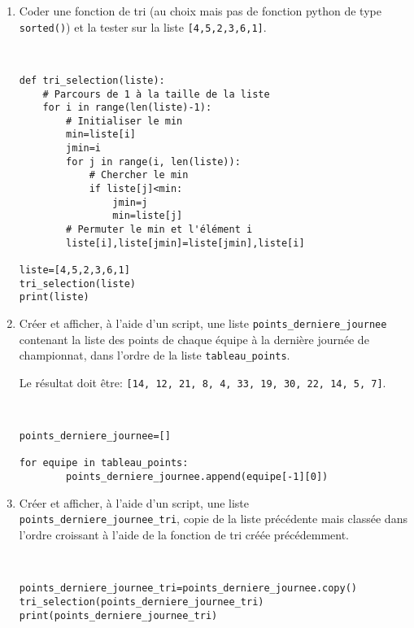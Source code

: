 \begin{enumerate}
\item Coder une fonction de tri (au choix mais pas de fonction python de type \verb?sorted()?) et la tester sur la liste \verb?[4,5,2,3,6,1]?.

\begin{solution}~\ \\
\begin{verbatim}
def tri_selection(liste): 
    # Parcours de 1 à la taille de la liste
    for i in range(len(liste)-1):
        # Initialiser le min
        min=liste[i]
        jmin=i
        for j in range(i, len(liste)):
            # Chercher le min
            if liste[j]<min:
                jmin=j
                min=liste[j]
        # Permuter le min et l'élément i
        liste[i],liste[jmin]=liste[jmin],liste[i]

liste=[4,5,2,3,6,1]
tri_selection(liste)
print(liste)
\end{verbatim}
\end{solution}

\item Créer et afficher, à l'aide d'un script, une liste \verb?points_derniere_journee? contenant la liste des points de chaque équipe à la dernière journée de championnat, dans l'ordre de la liste \verb?tableau_points?.

Le résultat doit être: \verb?[14, 12, 21, 8, 4, 33, 19, 30, 22, 14, 5, 7]?.

\begin{solution}~\ \\
\begin{verbatim}
points_derniere_journee=[]

for equipe in tableau_points:
        points_derniere_journee.append(equipe[-1][0])
\end{verbatim}
\end{solution}

\item Créer et afficher, à l'aide d'un script, une liste \verb?points_derniere_journee_tri?, copie de la liste précédente mais classée dans l'ordre croissant à l'aide de la fonction de tri créée précédemment.

\begin{solution}~\ \\
\begin{verbatim}
points_derniere_journee_tri=points_derniere_journee.copy()
tri_selection(points_derniere_journee_tri)
print(points_derniere_journee_tri)
\end{verbatim}
\end{solution}


\end{enumerate}
